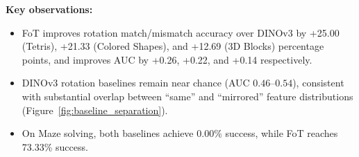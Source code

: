 \documentclass{l4proj}
\begin{document}
\begin{table}[H]
    \centering
    \caption{Performance comparison between our FoT pipeline, DINOv3 baselines, and GPT-4o-mini zero-shot across four spatial reasoning tasks.}
    \label{tab:results_all}
\end{table}


\noindent\textbf{Key observations:}
\begin{itemize}
    \item FoT improves rotation match/mismatch accuracy over DINOv3 by +25.00 (Tetris), +21.33 (Colored Shapes), and +12.69 (3D Blocks) percentage points, and improves AUC by +0.26, +0.22, and +0.14 respectively.
    \item DINOv3 rotation baselines remain near chance (AUC $0.46$--$0.54$), consistent with substantial overlap between ``same'' and ``mirrored'' feature distributions (Figure~\ref{fig:baseline_separation}).
    \item On Maze solving, both baselines achieve 0.00\% success, while FoT reaches 73.33\% success.
\end{itemize}
\end{document}

